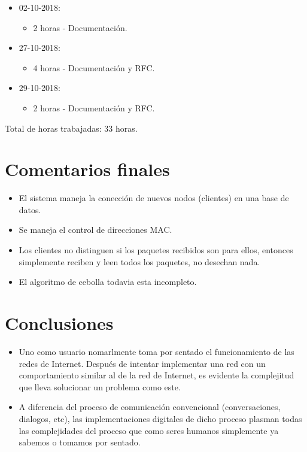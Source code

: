 \documentclass{article}
\begin{document}
\begin{itemize}
\begin{itemize}
  \end{itemize}
  \item 02-10-2018:
  \begin{itemize}
    \item 2 horas - Documentaci\'on.
  \end{itemize}
  \item 27-10-2018:
  \begin{itemize}
    \item 4 horas - Documentaci\'on y RFC.
  \end{itemize}
  \item 29-10-2018:
  \begin{itemize}
    \item 2 horas - Documentaci\'on y RFC.
  \end{itemize}
\end{itemize}
Total de horas trabajadas: 33 horas.

\section{Comentarios finales}
\begin{itemize}
  \item El sistema maneja la conecci\'on de nuevos nodos (clientes) en una base de datos.
  \item Se maneja el control de direcciones MAC.
  \item Los clientes no distinguen si los paquetes recibidos son para ellos, entonces simplemente reciben y leen todos los paquetes, no desechan nada.
  \item El algoritmo de cebolla todavia esta incompleto.
\end{itemize}

\section{Conclusiones}
\begin{itemize}
  \item Uno como usuario nomarlmente toma por sentado el funcionamiento de las redes de Internet. Despu\'es de intentar implementar una red con un comportamiento similar al de la red de Internet, es evidente la complejitud que lleva solucionar un problema como este.
  \item A diferencia del proceso de comunicaci\'on convencional (conversaciones, dialogos, etc), las implementaciones digitales de dicho proceso plasman todas las complejidades del proceso que como seres humanos simplemente ya sabemos o tomamos por sentado.
\end{itemize}
\end{document}
